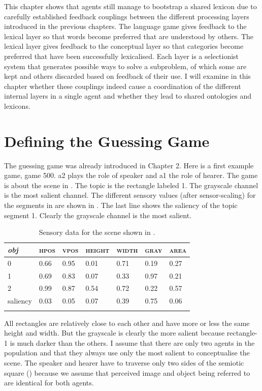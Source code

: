 This chapter shows that agents still manage to 
bootstrap a shared lexicon due to carefully established
feedback couplings between the different processing
layers introduced in the previous chapters. 
The language game gives feedback to the lexical layer so 
that words become preferred that are understood by others.
The lexical layer gives feedback to the conceptual layer
so that categories become preferred that have been
successfully lexicalised. Each layer is a selectionist system
that generates possible ways to solve a subproblem, of which some 
are kept and others discarded based on feedback of their use.
I will examine in this chapter whether these
couplings indeed cause a coordination of the different internal
layers in a single agent and whether they lead to shared 
ontologies and lexicons. 

\section{Defining the Guessing Game}

The guessing game was already introduced in Chapter 2. Here is a first example game, game 500.
{\bfshape  a2} plays the role of speaker and {\bfshape  a1} the role of hearer. The game is about the scene in
. The topic is the rectangle labeled 1. The grayscale channel is the most 
salient channel. The different sensory values (after sensor-scaling)
for the segments in  are shown in 
. The last line shows the saliency of 
the topic segment 1.  Clearly the grayscale channel is the most salient. 


\begin{table}
\begin{center}
\begin{tabular}{ l  l  l  l  l  l  l }
\lsptoprule
{\itshape obj} & \textsc{hpos} & \textsc{vpos} & \textsc{height} & \textsc{width} & \textsc{gray} & \textsc{area} \\ \midrule
0 & 0.66 & 0.95 & 0.01 & 0.71 & 0.19 & 0.27\\ 
1 & 0.69 & 0.83 & 0.07 & 0.33 & 0.97 & 0.21\\ 
2 & 0.99 & 0.87 & 0.54 & 0.72 & 0.22 & 0.57\\ 
saliency & 0.03 & 0.05 & 0.07 & 0.39 & 0.75 & 0.06 \\ 
\lspbottomrule
\end{tabular}
\caption{\label{tab:t-rect1}Sensory data for the scene shown in .}
\end{center}
\end{table}
All rectangles are relatively close to each other and have more or less the 
same height and width. But the grayscale is clearly the more salient because rectangle-1 is 
much darker than the others. I assume that there are only two agents in the population and that they always use only 
the most salient to conceptualise the scene. 
The speaker and hearer have to traverse only 
two sides of the semiotic square ()
because we assume that perceived image and object being
referred to are identical for both agents. 


